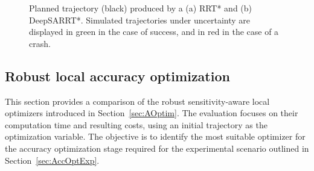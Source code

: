 


\begin{figure} [htp]
    \centering
    \caption{Planned trajectory (black) produced by a (a) RRT* and (b) DeepSARRT*. 
    Simulated trajectories under uncertainty are displayed in green in the case of success, and in red in the case of a crash.}%
    \label{fig: simu window}%
\end{figure}

\subsection{Robust local accuracy optimization} \label{sec:AccOptSimu}

This section provides a comparison of the robust sensitivity-aware local optimizers introduced in Section~\ref{sec:AOptim}. 
The evaluation focuses on their computation time and resulting costs, using an initial trajectory as the optimization variable.
The objective is to identify the most suitable optimizer for the accuracy optimization stage required for the experimental scenario outlined in Section~\ref{sec:AccOptExp}.

